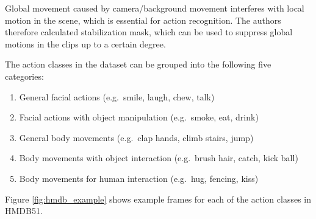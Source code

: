 Global movement caused by camera/background movement interferes with local motion in the scene, which is essential for action recognition.
The authors therefore calculated stabilization mask, which can be used to suppress global motions in the clips up to a certain degree. \cite{kuehne_hmdb:_2011}

The action classes in the dataset can be grouped into the following five categories: \cite{kuehne_hmdb:_2011}
\begin{enumerate}
    \item General facial actions (e.g.\ smile, laugh, chew, talk)
    \item Facial actions with object manipulation (e.g.\ smoke, eat, drink)
    \item General body movements (e.g.\ clap hands, climb stairs, jump)
    \item Body movements with object interaction (e.g.\ brush hair, catch, kick ball)
    \item Body movements for human interaction (e.g.\ hug, fencing, kiss)
\end{enumerate}

Figure \ref{fig:hmdb_example} shows example frames for each of the action classes in HMDB51.

